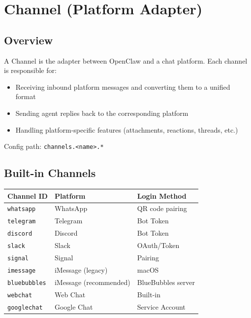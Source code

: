 \chapter{Channel (Platform Adapter)}

\section{Overview}

A Channel is the adapter between OpenClaw and a chat platform. Each channel is responsible for:

\begin{itemize}
  \item Receiving inbound platform messages and converting them to a unified format
  \item Sending agent replies back to the corresponding platform
  \item Handling platform-specific features (attachments, reactions, threads, etc.)
\end{itemize}

Config path: \texttt{channels.<name>.*}

\section{Built-in Channels}

\begin{center}
\begin{tabular}{lll}
\toprule
\textbf{Channel ID} & \textbf{Platform} & \textbf{Login Method} \\
\midrule
\texttt{whatsapp} & WhatsApp & QR code pairing \\
\texttt{telegram} & Telegram & Bot Token \\
\texttt{discord} & Discord & Bot Token \\
\texttt{slack} & Slack & OAuth/Token \\
\texttt{signal} & Signal & Pairing \\
\texttt{imessage} & iMessage (legacy) & macOS \\
\texttt{bluebubbles} & iMessage (recommended) & BlueBubbles server \\
\texttt{webchat} & Web Chat & Built-in \\
\texttt{googlechat} & Google Chat & Service Account \\
\bottomrule
\end{tabular}
\end{center}

